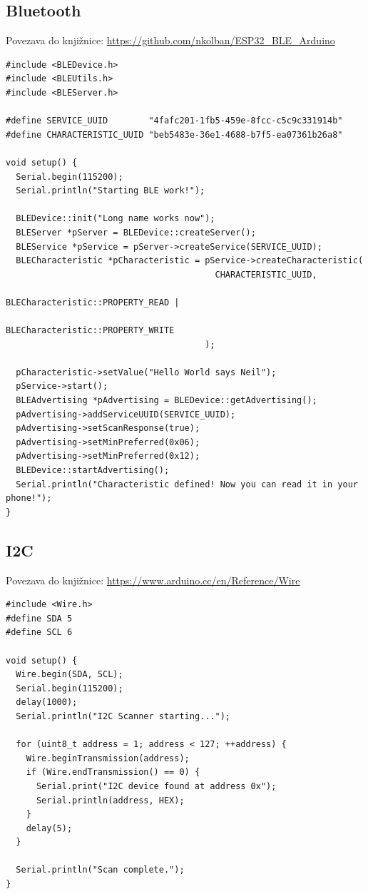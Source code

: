 \subsection{Bluetooth}
Povezava do knjižnice: \url{https://github.com/nkolban/ESP32_BLE_Arduino}
\begin{lstlisting}[language=Arduino]  
#include <BLEDevice.h>
#include <BLEUtils.h>
#include <BLEServer.h>

#define SERVICE_UUID        "4fafc201-1fb5-459e-8fcc-c5c9c331914b"
#define CHARACTERISTIC_UUID "beb5483e-36e1-4688-b7f5-ea07361b26a8"

void setup() {
  Serial.begin(115200);
  Serial.println("Starting BLE work!");

  BLEDevice::init("Long name works now");
  BLEServer *pServer = BLEDevice::createServer();
  BLEService *pService = pServer->createService(SERVICE_UUID);
  BLECharacteristic *pCharacteristic = pService->createCharacteristic(
                                         CHARACTERISTIC_UUID,
                                         BLECharacteristic::PROPERTY_READ |
                                         BLECharacteristic::PROPERTY_WRITE
                                       );

  pCharacteristic->setValue("Hello World says Neil");
  pService->start();
  BLEAdvertising *pAdvertising = BLEDevice::getAdvertising();
  pAdvertising->addServiceUUID(SERVICE_UUID);
  pAdvertising->setScanResponse(true);
  pAdvertising->setMinPreferred(0x06);
  pAdvertising->setMinPreferred(0x12);
  BLEDevice::startAdvertising();
  Serial.println("Characteristic defined! Now you can read it in your phone!");
}
\end{lstlisting}

\subsection{I2C}
Povezava do knjižnice: \url{https://www.arduino.cc/en/Reference/Wire}
\begin{lstlisting}[language=Arduino]  
#include <Wire.h>
#define SDA 5
#define SCL 6

void setup() {
  Wire.begin(SDA, SCL);
  Serial.begin(115200);
  delay(1000);
  Serial.println("I2C Scanner starting...");

  for (uint8_t address = 1; address < 127; ++address) {
    Wire.beginTransmission(address);
    if (Wire.endTransmission() == 0) {
      Serial.print("I2C device found at address 0x");
      Serial.println(address, HEX);
    }
    delay(5);
  }

  Serial.println("Scan complete.");
}
\end{lstlisting}

